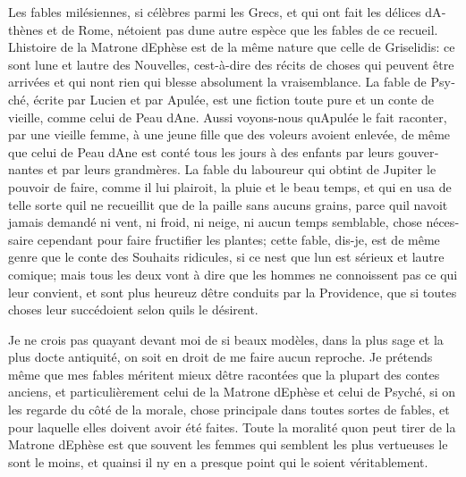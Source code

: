 \documentclass[14pt,a4paper]{memoir}
\begin{document}
{{\begin{otherlanguage}{french}
Les fables milésiennes, si célèbres parmi les Grecs, et qui ont fait les
délices d\textquotesingle Athènes et de Rome, n\textquotesingle étoient
pas d\textquotesingle une autre espèce que les fables de ce recueil.
L\textquotesingle histoire de la Matrone d\textquotesingle Ephèse est de
la même nature que celle de Griselidis: ce sont l\textquotesingle une et
l\textquotesingle autre des Nouvelles, c\textquotesingle est-à-dire des
récits de choses qui peuvent être arrivées et qui n\textquotesingle ont
rien qui blesse absolument la vraisemblance. La fable de Psyché, écrite
par Lucien et par Apulée, est une fiction toute pure et un conte de
vieille, comme celui de Peau d\textquotesingle Ane. Aussi voyons-nous
qu\textquotesingle Apulée le fait raconter, par une vieille femme, à une
jeune fille que des voleurs avoient enlevée, de même que celui de Peau
d\textquotesingle Ane est conté tous les jours à des enfants par leurs
gouvernantes et par leurs grand\textquotesingle mères. La fable du
laboureur qui obtint de Jupiter le pouvoir de faire, comme il lui
plairoit, la pluie et le beau temps, et qui en usa de telle sorte
qu\textquotesingle il ne recueillit que de la paille sans aucuns grains,
parce qu\textquotesingle il n\textquotesingle avoit jamais demandé ni
vent, ni froid, ni neige, ni aucun temps semblable, chose nécessaire
cependant pour faire fructifier les plantes; cette fable, dis-je, est de
même genre que le conte des Souhaits ridicules, si ce
n\textquotesingle est que l\textquotesingle un est sérieux et
l\textquotesingle autre comique; mais tous les deux vont à dire que les
hommes ne connoissent pas ce qui leur convient, et sont plus heureuz
d\textquotesingle être conduits par la Providence, que si toutes choses
leur succédoient selon qu\textquotesingle ils le désirent.

Je ne crois pas qu\textquotesingle ayant devant moi de si beaux modèles,
dans la plus sage et la plus docte antiquité, on soit en droit de me
faire aucun reproche. Je prétends même que mes fables méritent mieux
d\textquotesingle être racontées que la plupart des contes anciens, et
particulièrement celui de la Matrone d\textquotesingle Ephèse et celui
de Psyché, si on les regarde du côté de la morale, chose principale dans
toutes sortes de fables, et pour laquelle elles doivent avoir été
faites. Toute la moralité qu\textquotesingle on peut tirer de la Matrone
d\textquotesingle Ephèse est que souvent les femmes qui semblent les
plus vertueuses le sont le moins, et qu\textquotesingle ainsi il
n\textquotesingle y en a presque point qui le soient véritablement.


\end{otherlanguage}}}
\end{document}
